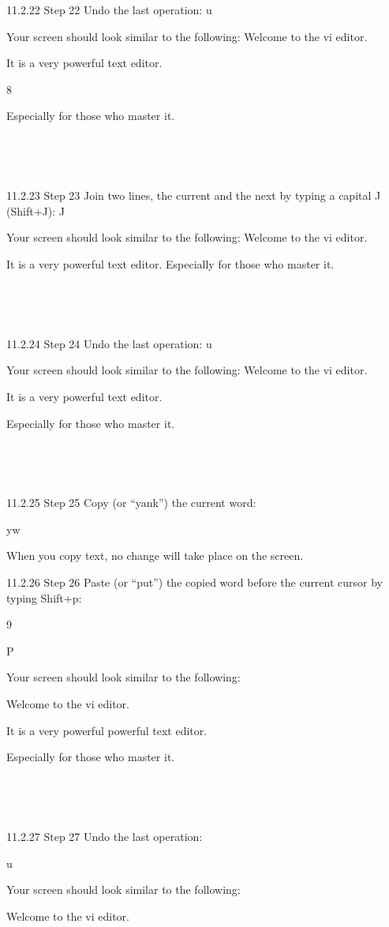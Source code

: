 11.2.22 Step 22
Undo the last operation:
u

Your screen should look similar to the following:
Welcome to the vi editor.

It is a very powerful text editor.

8



Especially for those who master it.

~

~

11.2.23 Step 23
Join two lines, the current and the next by typing a capital J (Shift+J):
J

Your screen should look similar to the following:
Welcome to the vi editor.

It is a very powerful text editor. Especially for those who master it.

~

~

11.2.24 Step 24
Undo the last operation:
u

Your screen should look similar to the following:
Welcome to the vi editor.

It is a very powerful text editor.

Especially for those who master it.

~

~

11.2.25 Step 25
Copy (or “yank”) the current word:

yw

When you copy text, no change will take place on the screen.

11.2.26 Step 26
Paste (or “put”) the copied word before the current cursor by typing Shift+p:

9



P

Your screen should look similar to the following:

Welcome to the vi editor.

It is a very powerful powerful text editor.

Especially for those who master it.

~

~

11.2.27 Step 27
Undo the last operation:

u

Your screen should look similar to the following:

Welcome to the vi editor.


